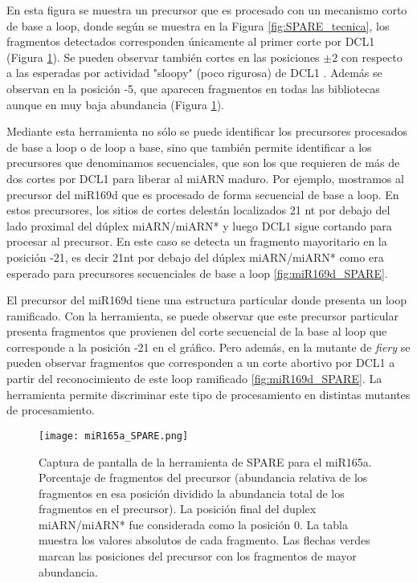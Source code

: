 En esta figura se muestra un precursor que es procesado con un mecanismo corto de base a loop, donde según se muestra en la Figura \ref{fig:SPARE_tecnica}, los fragmentos detectados corresponden únicamente al primer corte por DCL1 (Figura \ref{fig:miR165a_SPARE}).
Se pueden observar también cortes en las posiciones $\pm 2$ con respecto a las esperadas por actividad "sloopy" (poco rigurosa) de DCL1 \citep{pmid17989254}.
Además se observan en la posición -5, que aparecen fragmentos en todas las bibliotecas aunque en muy baja abundancia (Figura \ref{fig:miR165a_SPARE}).

Mediante esta herramienta no sólo se puede identificar los precursores procesados de base a loop o de loop a base, sino que también permite identificar a los precursores que denominamos secuenciales, que son los que requieren de más de dos cortes por DCL1 para liberar al miARN maduro.
Por ejemplo, mostramos al precursor del miR169d que es procesado de forma secuencial de base a loop.
En estos precursores, los sitios de cortes delestán localizados 21 nt por debajo del lado proximal del dúplex miARN/miARN* y luego DCL1 sigue cortando para procesar al precursor.
En este caso se detecta un fragmento mayoritario en la posición -21, es decir 21nt por debajo del dúplex miARN/miARN* como era esperado para precursores secuenciales de base a loop \ref{fig:miR169d_SPARE}.

El precursor del miR169d tiene una estructura particular donde presenta un loop ramificado.
Con la herramienta, se puede observar que este precursor particular presenta fragmentos que provienen del corte secuencial de la base al loop que corresponde a la posición -21 en el gráfico.
Pero además, en la mutante de \textit{fiery} se pueden observar fragmentos que corresponden a un corte abortivo por DCL1 a partir del reconocimiento de este loop ramificado \ref{fig:miR169d_SPARE}.
La herramienta permite discriminar este tipo de procesamiento en distintas mutantes de procesamiento. 

\begin{landscape}
    \begin{figure}[htbp!] 
        \centering    
        \texttt{[image: miR165a\_SPARE.png]}
        \caption[Captura de pantalla de la herramienta de SPARE para el miR165a]{Captura de pantalla de la herramienta de SPARE para el miR165a.
        Porcentaje de fragmentos del precursor (abundancia relativa de los fragmentos en esa posición dividido la abundancia total de los fragmentos en el precursor).
        La posición final del duplex miARN/miARN* fue considerada como la posición 0.
        La tabla muestra los valores absolutos de cada fragmento.
        Las flechas verdes marcan las posiciones del precursor con los fragmentos de mayor abundancia. 
        }
         \label{fig:miR165a_SPARE}
    \end{figure}
\end{landscape}

